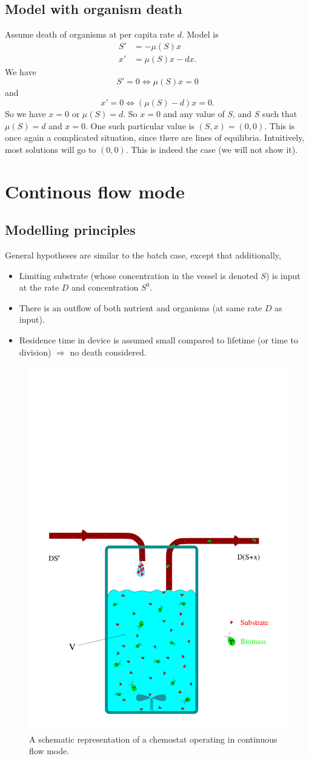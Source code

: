 \subsection{Model with organism death}
Assume death of organisms at per capita rate $d$. Model is
\begin{subequations}\label{sys:chemo_batch_death}
\begin{align}
S' &= -\mu(S)x \\
x' &= \mu(S)x-dx.
\end{align}
\end{subequations}
We have
\[
S'=0\Leftrightarrow \mu(S)x=0
\]
and
\[
x'=0\Leftrightarrow (\mu(S)-d)x=0.
\]
So we have $x=0$ or $\mu(S)=d$. So $x=0$ and any value of $S$, and $S$ such that $\mu(S)=d$ and $x=0$. One such particular value is $(S,x)=(0,0)$.
This is once again a complicated situation, since there are lines of equilibria. Intuitively, most solutions will go to $(0,0)$. This is indeed the case (we will not show it).



\section{Continous flow mode}
\subsection{Modelling principles}
General hypotheses are similar to the batch case, except that additionally,
\begin{itemize}
\item Limiting substrate (whose concentration in the vessel is denoted $S$) is input at the rate $D$ and concentration $S^0$.
\item There is an outflow of both nutrient and organisms (at same rate $D$ as input). 
\item Residence time in device is assumed small compared to lifetime (or time to division) $\Rightarrow$ no death considered.
\end{itemize}

\begin{figure}[htbp]
\begin{center}
\includegraphics[height=0.45\textwidth]{../figs_05_chemostat/figchemo_eng}
\caption{A schematic representation of a chemostat operating in continuous flow
mode.}
\label{fig:schema_chemostat_CSTR}
\end{center}
\end{figure}


